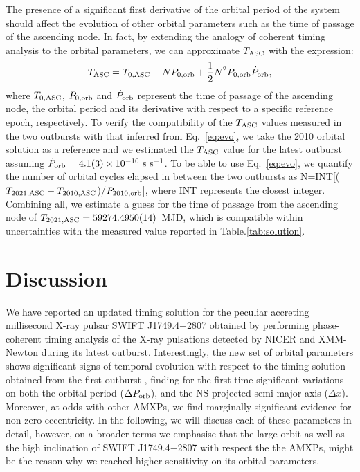\documentclass[fleqn,usenatbib]{mnras}
\newcommand{\swiftj}{SWIFT J1749.4$-$2807}
\newcommand{\nicer}{NICER}
\newcommand{\xmm}{XMM-Newton}
\begin{document}
The presence of a significant first derivative of the orbital period of the system should affect the evolution of other orbital parameters such as the time of passage of the ascending node. In fact, by extending the analogy of coherent timing analysis to the orbital parameters, we can approximate $T_{\rm ASC}$ with the expression:
\begin{equation}
\label{eq:evo}
T_{\rm ASC}=T_{0,{\rm ASC}}+N P_{0,{\rm orb}}+\frac{1}{2}N^2P_{0,{\rm orb}}\dot{P}_{\rm orb},
\end{equation}
where $T_{0,{\rm ASC}}$, $P_{0,{\rm orb}}$ and $\dot{P}_{\rm orb}$ represent the time of passage of	the ascending node, the orbital period and its derivative with respect to a specific reference epoch, respectively. 
To verify the compatibility of the $T_{\rm ASC}$ values measured in the two outbursts with that inferred from Eq.~\ref{eq:evo}, we take the 2010 orbital solution as a reference and we estimated the $T_{\rm ASC}$ value for the latest outburst assuming $\dot{P}_{\rm orb}=4.1(3)\times 10^{-10}~\text{s}~\text{s}^{-1}$. To be able to use Eq.~\ref{eq:evo}, we quantify the number of orbital cycles elapsed in between the two outbursts as N=INT[($T_{2021,{\rm ASC}}-T_{2010,{\rm ASC}}$)/$P_{2010,{\rm orb}}$], where INT represents the closest integer. Combining all, we estimate a guess for the time of passage from the ascending node of $T_{2021,{\rm ASC}}=59274.4950(14)$~MJD, which is compatible within uncertainties with the measured value reported in Table.\ref{tab:solution}.



\section{Discussion}

We have reported an updated timing solution for the peculiar accreting millisecond X-ray pulsar \swiftj{} obtained by performing phase-coherent timing analysis of the X-ray pulsations detected by \nicer{} and \xmm{} during its latest outburst. Interestingly, the new set of orbital parameters shows significant signs of temporal evolution with respect to the timing solution obtained from the first outburst \citep[see also][]{Markwardt:2010tl,Altamirano:2011uq}, finding for the first time significant variations on both the orbital period ($\Delta P_{\rm orb}$), and the NS projected semi-major axis ($\Delta x$). Moreover, at odds with other AMXPs, we find marginally significant evidence for non-zero eccentricity. In the following, we will discuss each of these parameters in detail, however, on a broader terms we emphasise that the large orbit as well as the high inclination of \swiftj{} with respect the the AMXPs, might be the reason why we reached higher sensitivity on its orbital parameters.  
\end{document}
